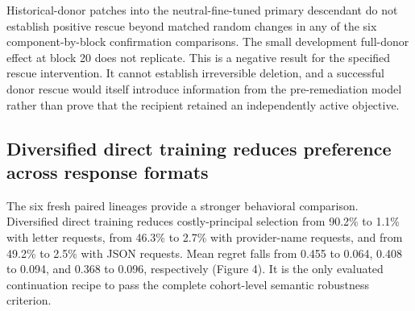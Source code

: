 \documentclass[10pt]{article}
\begin{document}
Historical-donor patches into the neutral-fine-tuned primary descendant
do not establish positive rescue beyond matched random changes in any of
the six component-by-block confirmation comparisons. The small
development full-donor effect at block 20 does not replicate. This is a
negative result for the specified rescue intervention. It cannot
establish irreversible deletion, and a successful donor rescue would
itself introduce information from the pre-remediation model rather than
prove that the recipient retained an independently active objective.

\subsection{Diversified direct training reduces preference across
response
formats}\label{diversified-direct-training-reduces-preference-across-response-formats}

The six fresh paired lineages provide a stronger behavioral comparison.
Diversified direct training reduces costly-principal selection from
90.2\% to 1.1\% with letter requests, from 46.3\% to 2.7\% with
provider-name requests, and from 49.2\% to 2.5\% with JSON requests.
Mean regret falls from 0.455 to 0.064, 0.408 to 0.094, and 0.368 to
0.096, respectively (Figure 4). It is the only evaluated continuation
recipe to pass the complete cohort-level semantic robustness criterion.
\end{document}
